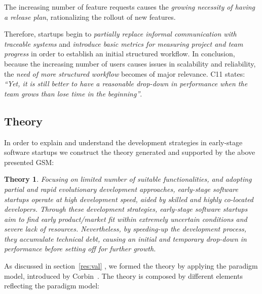 \documentclass[10pt,journal,letterpaper,compsoc]{IEEEtran}
\newtheorem*{theory}{Theory}
\begin{document}
The increasing number of feature requests causes the \textit{growing necessity
of having a release plan}, rationalizing the rollout of new features.

Therefore, startups begin to \textit{partially replace informal communication
with traceable systems} and \textit{introduce basic metrics for measuring
project and team progress} in order to establish an initial structured workflow.
In conclusion, because the increasing number of users causes issues in
scalability and reliability, the \textit{need of more structured workflow}
becomes of major relevance. C11 states: \textit{``Yet, it is still better to
have a reasonable drop-down in performance when the team grows than lose time 
in the beginning''}.

\subsection{Theory}\label{res:gsm:th}
In order to explain and understand the development strategies in early-stage 
software startups we construct the theory generated and supported by the above 
presented GSM:

\begin{theory} Focusing on limited number of suitable functionalities, and
adopting partial and rapid evolutionary development approaches, early-stage
software startups operate at high development speed, aided by skilled and
highly co-located developers. Through these development strategies, early-stage
software startups aim to find early product/market fit within extremely
uncertain conditions and severe lack of resources. Nevertheless, by speeding-up
the development process, they accumulate technical debt, causing an initial and
temporary drop-down in performance before setting off for further growth.
\end{theory}

As discussed in section~\ref{res:val} %
, we formed the theory by applying the paradigm model, introduced by 
Corbin~\cite{Corbin1990}. The theory is composed by different elements 
reflecting the paradigm model:
\end{document}
